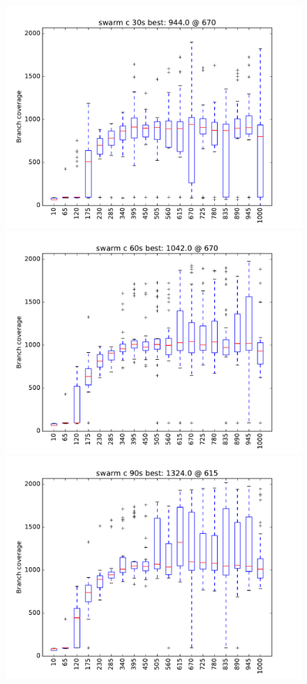\begin{figure}
\includegraphics[width=\columnwidth]{graphs/Cswarm30}
\includegraphics[width=\columnwidth]{graphs/Cswarm60}
\includegraphics[width=\columnwidth]{graphs/Cswarm90}
\end{figure}


